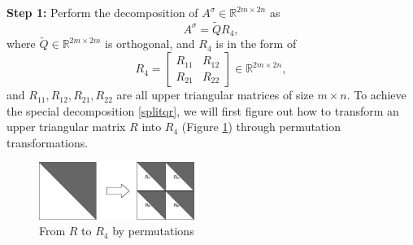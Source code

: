 \documentclass[12pt]{article}
\begin{document}
\textbf{Step 1:} Perform the decomposition of $A^\sigma \in \mathbb{R}^{2m \times 2n}$ as 
\begin{equation}\label{splitqr}
A^\sigma = \widetilde{Q} R_4,
\end{equation} 
where $\widetilde{Q} \in \mathbb{R}^{2m\times 2m}$ is orthogonal, and $R_4  $ is in the form of 
\begin{equation}\label{r4}
R_4 = \begin{bmatrix}
    R_{11} & R_{12} \\
    R_{21} & R_{22}
\end{bmatrix} \in \mathbb{R}^{2m \times 2n},
\end{equation}
and $R_{11}, R_{12},R_{21},R_{22}$ are all upper triangular matrices of size $m \times n$. To achieve the special decomposition \eqref{splitqr}, we will first  figure out how to  transform an upper triangular matrix $R$ into $R_4$ (Figure \ref{fig:Figure_1}) through permutation transformations.
\begin{figure}[htbp]
        \centering
        \includegraphics[width=0.45\textwidth,keepaspectratio=true]{images/Figure_1.png} %
        \caption{From $R$ to $R_4$ by permutations }
        \label{fig:Figure_1}
\end{figure}
\end{document}
